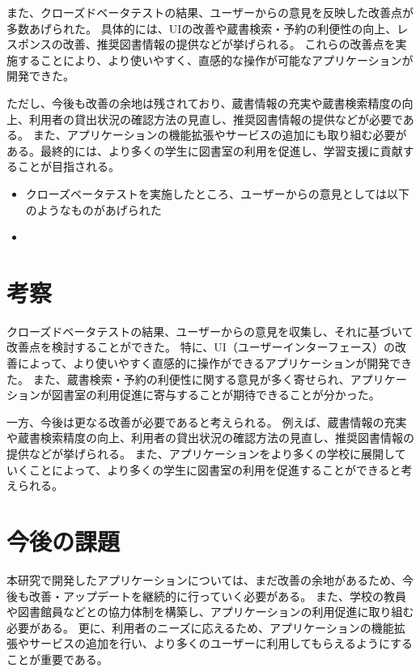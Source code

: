 \documentclass[pdflatex,ja=standard,twocolumn]{bxjsarticle}
\begin{document}
また、クローズドベータテストの結果、ユーザーからの意見を反映した改善点が多数あげられた。
具体的には、UIの改善や蔵書検索・予約の利便性の向上、レスポンスの改善、推奨図書情報の提供などが挙げられる。
これらの改善点を実施することにより、より使いやすく、直感的な操作が可能なアプリケーションが開発できた。

ただし、今後も改善の余地は残されており、蔵書情報の充実や蔵書検索精度の向上、利用者の貸出状況の確認方法の見直し、推奨図書情報の提供などが必要である。
また、アプリケーションの機能拡張やサービスの追加にも取り組む必要がある。最終的には、より多くの学生に図書室の利用を促進し、学習支援に貢献することが目指される。
\begin{itemize}
 \item クローズベータテストを実施したところ、ユーザーからの意見としては以下のようなものがあげられた
 \item 
\end{itemize}

\section{考察}
クローズドベータテストの結果、ユーザーからの意見を収集し、それに基づいて改善点を検討することができた。
特に、UI（ユーザーインターフェース）の改善によって、より使いやすく直感的に操作ができるアプリケーションが開発できた。
また、蔵書検索・予約の利便性に関する意見が多く寄せられ、アプリケーションが図書室の利用促進に寄与することが期待できることが分かった。

一方、今後は更なる改善が必要であると考えられる。
例えば、蔵書情報の充実や蔵書検索精度の向上、利用者の貸出状況の確認方法の見直し、推奨図書情報の提供などが挙げられる。
また、アプリケーションをより多くの学校に展開していくことによって、より多くの学生に図書室の利用を促進することができると考えられる。
\section{今後の課題}
本研究で開発したアプリケーションについては、まだ改善の余地があるため、今後も改善・アップデートを継続的に行っていく必要がある。
また、学校の教員や図書館員などとの協力体制を構築し、アプリケーションの利用促進に取り組む必要がある。
更に、利用者のニーズに応えるため、アプリケーションの機能拡張やサービスの追加を行い、より多くのユーザーに利用してもらえるようにすることが重要である。
\end{document}
